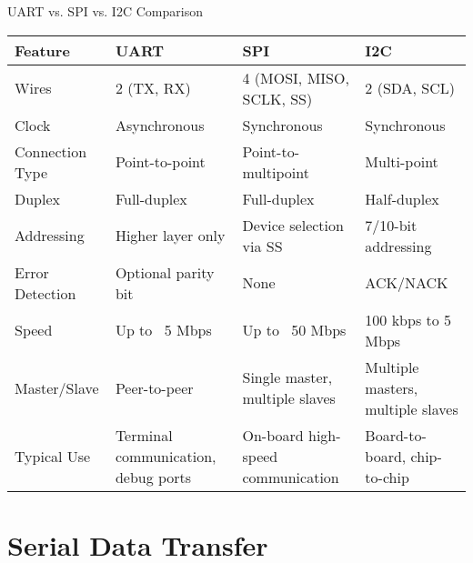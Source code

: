 \begin{concept}{UART vs. SPI vs. I2C Comparison}
\begin{center}
\begin{tabular}{|p{2.5cm}|p{4cm}|p{4cm}|p{4cm}|}
\hline
\textbf{Feature} & \textbf{UART} & \textbf{SPI} & \textbf{I2C} \\
\hline
Wires & 2 (TX, RX) & 4 (MOSI, MISO, SCLK, SS) & 2 (SDA, SCL) \\
\hline
Clock & Asynchronous & Synchronous & Synchronous \\
\hline
Connection Type & Point-to-point & Point-to-multipoint & Multi-point \\
\hline
Duplex & Full-duplex & Full-duplex & Half-duplex \\
\hline
Addressing & Higher layer only & Device selection via SS & 7/10-bit addressing \\
\hline
Error Detection & Optional parity bit & None & ACK/NACK \\
\hline
Speed & Up to ~5 Mbps & Up to ~50 Mbps & 100 kbps to 5 Mbps \\
\hline
Master/Slave & Peer-to-peer & Single master, multiple slaves & Multiple masters, multiple slaves \\
\hline
Typical Use & Terminal communication, debug ports & On-board high-speed communication & Board-to-board, chip-to-chip \\
\hline
\end{tabular}
\end{center}
\end{concept}

\section{Serial Data Transfer}

